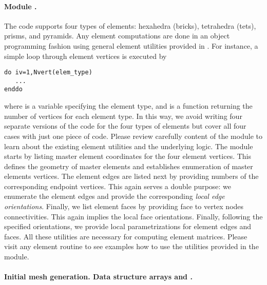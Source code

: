 \paragraph{Module .}
The code supports four types of elements: hexahedra (bricks), tetrahedra (tets), prisms, and pyramids. Any element computations are done in an object programming fashion using general element utilities provided in . For instance, a simple loop through element vertices is executed by

\begin{lstlisting}[caption=Loop over element vertices., label={lst:loop_element_vertices}]
do iv=1,Nvert(elem_type)
   ...
enddo
\end{lstlisting}

\noindent where  is a variable specifying the element type, and  is a function returning the number of vertices for each element type. In this way, we avoid writing four separate versions of the code for the four types of elements but cover all four cases with just one piece of code. Please review carefully content of the module to learn about the existing element utilities and the underlying logic. The module starts by listing master element coordinates for the four element vertices. This defines the geometry of master elements and establishes enumeration of master elements vertices. The element edges are listed next by providing numbers of the corresponding endpoint vertices. This again serves a double purpose: we enumerate the element edges and provide the corresponding {\em local edge orientations}. Finally, we list element faces by providing face to vertex nodes connectivities. This again implies the local face orientations. Finally, following the specified orientations, we provide local parametrizations for element edges and faces. All these utilities are necessary for computing element matrices. Please visit any element routine to see examples how to use the utilities provided in the module.

\paragraph{Initial mesh generation. Data structure arrays  and .}

